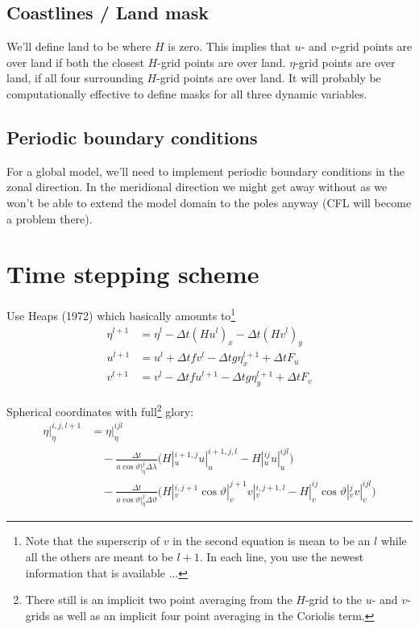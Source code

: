 \documentclass[a4paper]{article}
\begin{document}
\subsection{Coastlines / Land mask}

We'll define land to be where $H$ is zero. This implies that $u$- and $v$-grid
points are over land if both the closest $H$-grid points are over land.
$\eta$-grid points are over land, if all four surrounding $H$-grid points are over land.
It will probably be computationally effective to define masks for all three dynamic variables.


\subsection{Periodic boundary conditions}

For a global model, we'll need to implement periodic boundary conditions in the zonal
direction.  In the meridional direction we might get away without as we won't be able 
to extend the model domain to the poles anyway (CFL will become a problem there).


\section{Time stepping scheme}

Use Heaps (1972) which basically amounts to\footnote{Note that the superscrip
of $v$ in the second equation is mean to be an $l$ while all the others are meant
to be $l+1$. In each line, you use the newest information that is available ...}
\begin{align}
  \eta^{l+1} & = \eta^l - \Delta t (Hu^l)_x - \Delta t (Hv^l)_y \\
  u^{l+1} & = u^l + \Delta t f v^l - \Delta t g \eta^{l+1}_x + \Delta t F_u\\
  v^{l+1} & = v^l - \Delta t f u^{l+1} - \Delta t g \eta^{l+1}_y + \Delta t F_v
\end{align}

Spherical coordinates with full\footnote{There still is an implicit two point
averaging from the $H$-grid to the $u$- and $v$-grids as well as an implicit
four point averaging in the Coriolis term.} glory:
\begin{equation}
  \begin{split}
    \eta|_\eta^{i,j,l+1} & = \eta|_\eta^{ijl} \\
    & \quad - \frac{\Delta t}{a\cos\vartheta|_\eta^{j}\Delta\lambda}
      \Biggl(H|_u^{i+1,j} u|_u^{i+1,j,l} - H|_u^{ij}u|_u^{ijl}\Biggr) \\
    & \quad - \frac{\Delta t}{a\cos\vartheta|_\eta^{j}\Delta\vartheta}  
      \Biggl(H|_v^{i,j+1}\cos\vartheta|_v^{j+1}v|_v^{i,j+1,l} - H|_v^{ij}\cos\vartheta|_v^{j}v|_v^{ijl}\Biggr)
  \end{split}
\end{equation}
\end{document}
